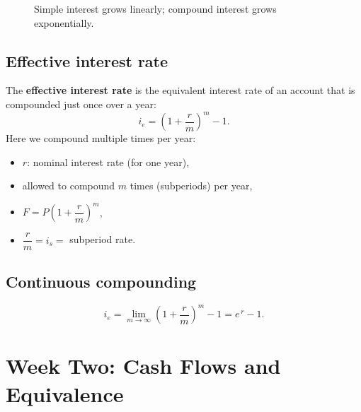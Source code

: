 \documentclass[11pt]{article}
\newcommand{\term}[1]{\textbf{\textcolor{cTerm}{#1}}}
\begin{document}
\begin{figure}[h]
\centering
{}
\caption*{Simple interest grows linearly; compound interest grows exponentially.}
\end{figure}

\subsection*{Effective interest rate}
The \term{effective interest rate} is the equivalent interest rate of an account
that is compounded just once over a year:
\[
i_e = \left(1 + \frac{r}{m}\right)^{m} - 1.
\]
Here we compound multiple times per year:
\begin{itemize}[nosep]
  \item $r$: nominal interest rate (for one year),
  \item allowed to compound $m$ times (subperiods) per year,
  \item $F = P\left(1+\dfrac{r}{m}\right)^{m}$,
  \item $\dfrac{r}{m} = i_s =$ subperiod rate.
\end{itemize}

\subsection*{Continuous compounding}
\[
i_e = \lim_{m\to\infty}\left(1+\frac{r}{m}\right)^{m} - 1 = e^{\,r} - 1.
\]

\section{Week Two: Cash Flows and Equivalence}
\end{document}
